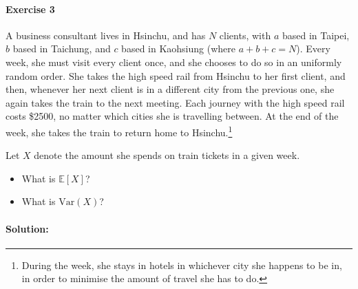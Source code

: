 \documentclass[a4paper,12pt]{article}
\newcommand{\story}[1]{\iftoggle{story}{\footnote{#1}}{}}
\begin{document}
\paragraph{Exercise 3}  A business consultant lives in Hsinchu, and has $N$ clients, with $a$ based in Taipei, $b$ based in Taichung, and $c$ based in Kaohsiung (where $a + b + c = N$). Every week, she must visit every client once, and she chooses to do so in an uniformly random order. She takes the high speed rail from Hsinchu to her first client, and then, whenever her next client is in a different city from the previous one, she again takes the train to the next meeting. Each journey with the high speed rail costs \$2500, no matter which cities she is travelling between.\story{Normally travelling between Taipei and Taichung or between Taichung and Kaohsiung would be much cheaper than travelling between Taipei and Kaohsiung, but the Taiwan High Speed Rail heard that this problem would be included on this week's homework, and decided to charge a flat fare for all her trips to make your calculations easier.\footnotemark[2]} At the end of the week, she takes the train to return home to Hsinchu.\footnote[3]{During the week, she stays in hotels in whichever city she happens to be in, in order to minimise the amount of travel she has to do.}

Let $X$ denote the amount she spends on train tickets in a given week.
\begin{itemize}
	\item[(a)] What is $\mathbb{E}[X]$?
	\item[(b)] What is $\textrm{Var}(X)$?
\end{itemize}

\paragraph{Solution:}
\end{document}
